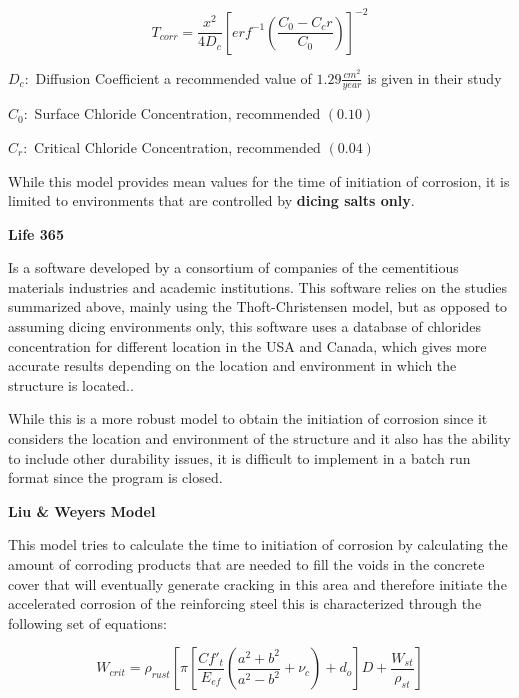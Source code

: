 \begin{equation}
T_{corr}=\frac{x^2}{4 D_c} \left[erf^{-1} \left(\frac{C_0-C_cr}{C_0} \right) \right]^{-2}
  \label{eq.three}
\end{equation} 

$D_c: $ Diffusion Coefficient a recommended value of $1.29 \frac{cm^2}{year}$ is given in their study \citep{Ghosh2010}

$C_0:$ Surface Chloride Concentration, recommended $(0.10)$
 
$C_r:$ Critical Chloride Concentration, recommended $(0.04)$
\newline

While this model provides mean values for the time of initiation of corrosion, it is limited to environments that are controlled by \textbf{dicing salts only}.
\newline

\textbf{Life 365}
\newline

Is a software developed by a consortium of companies of the cementitious materials industries and academic institutions. This software relies on the studies summarized above, mainly using the Thoft-Christensen model, but as opposed to assuming dicing environments only, this software uses a database of chlorides concentration for different location in the USA and Canada, which gives more accurate results depending on the location and environment in which the structure is located..

While this is a more robust model to obtain the initiation of corrosion since it considers the location and environment of the structure and it also has the ability to include other durability issues, it is difficult to implement in a batch run format since the program is closed.
\newline

\textbf{Liu \& Weyers Model}
\newline

This model tries to calculate the time to initiation of corrosion by calculating the amount of corroding products that are needed to fill the voids in the concrete cover that will eventually generate cracking in this area and therefore initiate the accelerated corrosion of the reinforcing steel this is characterized through the following set of equations:


\begin{equation}
  W_{crit}=\rho_{rust} \left[ \pi \left[ \frac{C f'_t}{E_{ef}} \left( \frac{a^2+b^2}{a^2-b^2}+\nu_c \right)+d_o \right] D+ \frac{W_{st}}{\rho_{st}} \right]
  \label{eq.four}
\end{equation} 

